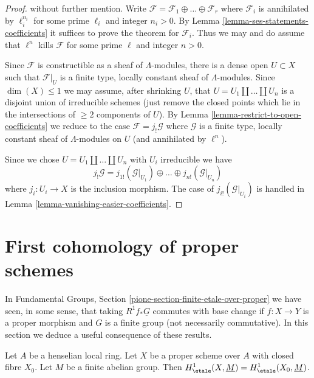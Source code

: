 \begin{proof}
without further mention.
Write $\mathcal{F} = \mathcal{F}_1 \oplus \ldots \oplus \mathcal{F}_r$
where $\mathcal{F}_i$ is annihilated by $\ell_i^{n_i}$
for some prime $\ell_i$ and integer $n_i > 0$.
By Lemma \ref{lemma-ses-statements-coefficients} it suffices
to prove the theorem for $\mathcal{F}_i$. Thus we may and do
assume that $\ell^n$ kills $\mathcal{F}$ for some prime $\ell$
and integer $n > 0$.

\medskip\noindent
Since $\mathcal{F}$ is constructible as a sheaf of $\Lambda$-modules,
there is a dense open $U \subset X$ such that $\mathcal{F}|_U$ is a
finite type, locally constant sheaf of $\Lambda$-modules.
Since $\dim(X) \leq 1$ we may assume, after shrinking $U$, that
$U = U_1 \amalg \ldots \amalg U_n$ is a disjoint union of irreducible
schemes (just remove the closed points which lie in the intersections
of $\geq 2$ components of $U$). By
Lemma \ref{lemma-restrict-to-open-coefficients}
we reduce to the case
$\mathcal{F} = j_!\mathcal{G}$ where $\mathcal{G}$ is a finite type,
locally constant sheaf of $\Lambda$-modules on $U$ (and annihilated
by $\ell^n$).

\medskip\noindent
Since we chose $U = U_1 \amalg \ldots \amalg U_n$ with $U_i$ irreducible
we have
$$
j_!\mathcal{G} =
j_{1!}(\mathcal{G}|_{U_1}) \oplus \ldots \oplus
j_{n!}(\mathcal{G}|_{U_n})
$$
where $j_i : U_i \to X$ is the inclusion morphism.
The case of $j_{i!}(\mathcal{G}|_{U_i})$ is handled in
Lemma \ref{lemma-vanishing-easier-coefficients}.
\end{proof}








\section{First cohomology of proper schemes}
\label{section-finite-etale-over-proper}

\noindent
In Fundamental Groups, Section \ref{pione-section-finite-etale-over-proper}
we have seen, in some sense, that taking
$R^1f_*\underline{G}$ commutes with base change if $f : X \to Y$
is a proper morphism and $G$ is a finite group (not necessarily
commutative). In this section
we deduce a useful consequence of these results.

\begin{lemma}
\label{lemma-proper-over-henselian-and-h1}
Let $A$ be a henselian local ring. Let $X$ be a proper scheme over $A$
with closed fibre $X_0$. Let $M$ be a finite abelian group.
Then $H^1_\etale(X, \underline{M}) = H^1_\etale(X_0, \underline{M})$.
\end{lemma}

